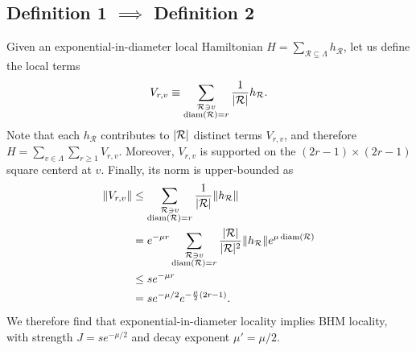 \subsection{Definition 1 \texorpdfstring{$\implies$}{implies} Definition 2}
Given an exponential-in-diameter local Hamiltonian $H = \sum_{\mathcal{R} \subseteq \Lambda} h_{\mathcal{R}}$, let us define the local terms
\begin{equation}
    V_{r, v} \equiv \sum_{\substack{\mathcal{R} \ni v \\ \operatorname{diam}(\mathcal{R}) = r}} \frac{1}{\abs{\mathcal{R}}} h_{\mathcal{R}} .
\end{equation}
Note that each $h_{\mathcal{R}}$ contributes to $\abs{\mathcal{R}}$ distinct terms $V_{r,v}$, and therefore $H = \sum_{v \in \Lambda} \sum_{r \geq 1} V_{r,v}$. Moreover, $V_{r,v}$ is supported on the $(2r-1) \times (2r-1)$ square centerd at $v$. Finally, its norm is upper-bounded as
\begin{subequations}
    \begin{align}
        \norm{V_{r,v}} &\leq \sum_{\substack{\mathcal{R} \ni v \\ \operatorname{diam}(\mathcal{R}) = r}} \frac{1}{|\mathcal{R}|} \norm{h_{\mathcal{R}}} \\
        &= e^{-\mu r} \sum_{\substack{\mathcal{R} \ni v \\ \operatorname{diam}(\mathcal{R}) = r}} \frac{|\mathcal{R}|}{|\mathcal{R}|^2} \norm{h_{\mathcal{R}}} e^{\mu \operatorname{diam}(\mathcal{R})} \\
        &\leq s e^{-\mu r} \\
        &= s e^{-\mu / 2} e^{- \frac{\mu}{2}(2r-1)} .
    \end{align}
\end{subequations}
We therefore find that exponential-in-diameter locality implies BHM locality, with strength $J = s e^{-\mu/2}$ and decay exponent $\mu' = \mu/2$.


